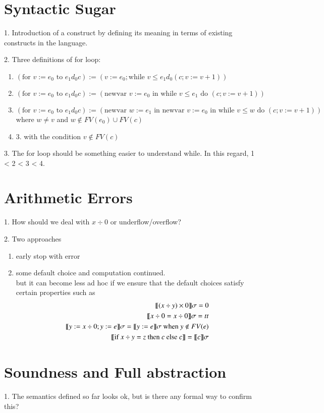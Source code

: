 \documentclass{report}[12pt]
\begin{document}
\section{Syntactic Sugar}
1. Introduction of a construct by defining its meaning in terms of existing constructs in the language.

2. Three definitions of for loop:
\begin{enumerate}
    \item $(\text{for }v:=e_0 \text{ to }e_1 d_0 c):=(v:=e_0;\text{while }v\le e_1 d_0 (c;v:=v+1))$
    \item $(\text{for }v:=e_0 \text{ to }e_1 d_0 c):=(\text{newvar }v:=e_0\text{ in while }v\le e_1 \text{ do }(c;v:=v+1))$
    \item $(\text{for }v:=e_0 \text{ to }e_1 d_0 c):=(\text{newvar }w:=e_1 \text{ in newvar }v:=e_0 \text{ in while }v\le w\text{ do }(c;v:=v+1))$\\
    where $w\neq v$ and $w \notin FV(e_0)\cup FV(c)$
    \item 3. with the condition $v\notin FV(c)$
\end{enumerate}
3. The for loop should be something easier to understand while. In this regard, 1 < 2 < 3 < 4.
\section{Arithmetic Errors}
1. How should we deal with $x\div 0$ or underflow/overflow?

2. Two approaches
\begin{enumerate}
    \item early stop with error
    \item some default choice and computation continued. \\
    but it can become less ad hoc if we ensure that the default choices satisfy certain properties such as
    \begin{align*}
        \llbracket (x\div y)\times 0 \rrbracket\sigma = 0 \\
        \llbracket x\div 0 = x \div 0 \rrbracket\sigma = tt \\
        \llbracket y:=x\div 0;y:=e \rrbracket \sigma = \llbracket y:=e \rrbracket\sigma \text{ when }y \notin FV(e) \\
        \llbracket \text{if }x\div y=z\text{ then }c \text{ else }c \rrbracket=\llbracket c \rrbracket\sigma
    \end{align*}
\end{enumerate}
\section{Soundness and Full abstraction}
1. The semantics defined so far looks ok, but is there any formal way to confirm this?
\end{document}
